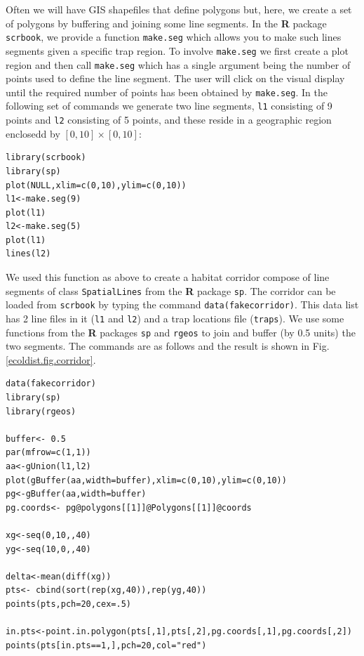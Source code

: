 Often we will have GIS shapefiles that define polygons but, here, we
 create a set of polygons by
buffering and joining some line segments.
In the {\bf R} package \mbox{\tt scrbook}, we provide
 a function \mbox{\tt make.seg} which allows you to make such
 lines segments given a
specific trap region.  To involve \mbox{\tt make.seg} we first
create a plot region and then call \mbox{\tt make.seg} which has a
single argument being the number of points used to define the line
segment. The user will click on the visual display until the required
number of points has been obtained by \mbox{\tt make.seg}.
In the following set of commands we generate two line
segments, \mbox{\tt l1} consisting of 9 points and \mbox{\tt l2}
consisting of 5 points, and these reside in a geographic region
enclosedd by $[0,10] \times [0,10]$:
{\small
\begin{verbatim}
library(scrbook)
library(sp)
plot(NULL,xlim=c(0,10),ylim=c(0,10))
l1<-make.seg(9)
plot(l1)
l2<-make.seg(5)
plot(l1)
lines(l2)
\end{verbatim}
}

We used this function as above to create a habitat corridor compose of
line segments of class
\mbox{\tt SpatialLines} from the {\bf R} package \mbox{\tt sp}. The
corridor can be loaded from \mbox{\tt scrbook} by typing the command
\mbox{\tt data(fakecorridor)}.
This data list has 2 line files in it (\mbox{\tt l1} and \mbox{\tt l2}) and a
trap locations file (\mbox{\tt traps}).
We use some functions from the {\bf R} packages \mbox{\tt sp} and
\mbox{\tt rgeos} to join and
buffer (by 0.5 units) the two segments. The commands are as follows
and the result is shown in Fig. \ref{ecoldist.fig.corridor}.

{\small
\begin{verbatim}
data(fakecorridor)
library(sp)
library(rgeos)

buffer<- 0.5
par(mfrow=c(1,1))
aa<-gUnion(l1,l2)
plot(gBuffer(aa,width=buffer),xlim=c(0,10),ylim=c(0,10))
pg<-gBuffer(aa,width=buffer)
pg.coords<- pg@polygons[[1]]@Polygons[[1]]@coords

xg<-seq(0,10,,40)
yg<-seq(10,0,,40)

delta<-mean(diff(xg))
pts<- cbind(sort(rep(xg,40)),rep(yg,40))
points(pts,pch=20,cex=.5)

in.pts<-point.in.polygon(pts[,1],pts[,2],pg.coords[,1],pg.coords[,2])
points(pts[in.pts==1,],pch=20,col="red")
\end{verbatim}
}


